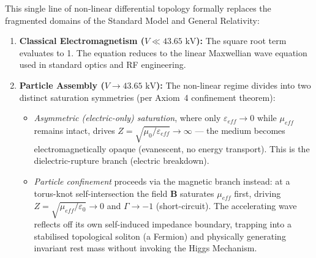 This single line of non-linear differential topology formally replaces the fragmented domains of the Standard Model and General Relativity:
\begin{enumerate}
    \item \textbf{Classical Electromagnetism ($V \ll 43.65\text{ kV}$):} The square root term evaluates to 1. The equation reduces to the linear Maxwellian wave equation used in standard optics and RF engineering.
    \item \textbf{Particle Assembly ($V \to 43.65\text{ kV}$):} The non-linear regime divides into two distinct saturation symmetries (per Axiom~4 confinement theorem):
    \begin{itemize}
        \item \emph{Asymmetric (electric-only) saturation}, where only $\varepsilon_{eff} \to 0$ while $\mu_{eff}$ remains intact, drives $Z = \sqrt{\mu_0/\varepsilon_{eff}} \to \infty$ --- the medium becomes electromagnetically opaque (evanescent, no energy transport). This is the dielectric-rupture branch (electric breakdown).
        \item \emph{Particle confinement} proceeds via the magnetic branch instead: at a torus-knot self-intersection the field $\mathbf{B}$ saturates $\mu_{eff}$ first, driving $Z = \sqrt{\mu_{eff}/\varepsilon_0} \to 0$ and $\Gamma \to -1$\gammaundeclared{} (short-circuit). The accelerating wave reflects off its own self-induced impedance boundary, trapping into a stabilised topological soliton (a Fermion) and physically generating invariant rest mass without invoking the Higgs Mechanism.


\end{itemize}
\end{enumerate}
